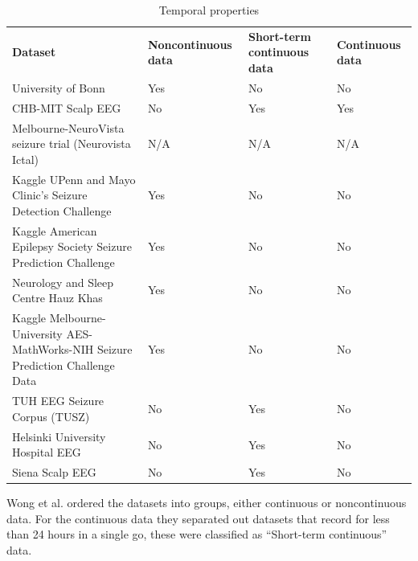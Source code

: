 \documentclass[12pt]{article}
\begin{document}
\begin{table}[H]
\centering
\begin{tabular}{p{}p{}p{}p{}}
  \textbf{Dataset} &
  \textbf{Noncontinuous data} &
  \textbf{Short-term continuous data} &
  \textbf{Continuous data} \\
  
University of Bonn                                                              & Yes & No  & No  \\
CHB-MIT Scalp EEG                                                               & No  & Yes & Yes \\
Melbourne-NeuroVista seizure trial (Neurovista Ictal)                           & N/A & N/A & N/A \\
Kaggle UPenn and Mayo Clinic's Seizure Detection Challenge                      & Yes & No  & No  \\
Kaggle American Epilepsy Society Seizure Prediction Challenge                   & Yes & No  & No  \\
Neurology and Sleep Centre Hauz Khas                                            & Yes & No  & No  \\
Kaggle Melbourne-University AES-MathWorks-NIH Seizure Prediction Challenge Data & Yes & No  & No  \\
TUH EEG Seizure Corpus (TUSZ)                                                   & No  & Yes & No  \\
Helsinki University Hospital EEG                                                & No  & Yes & No  \\
Siena Scalp EEG                                                                 & No  & Yes & No 
\end{tabular}
\caption{Temporal properties}
\end{table}

Wong et al. ordered the datasets into groups, either continuous or noncontinuous data. For the continuous data they separated out datasets that record for less than 24 hours in a single go, these were classified as ``Short-term continuous'' data.
\end{document}
